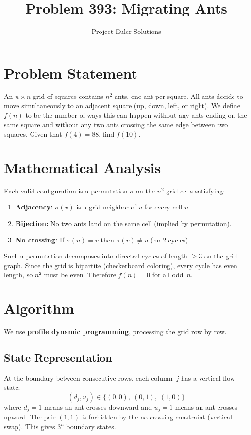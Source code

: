 \documentclass[11pt]{article}
\title{Problem 393: Migrating Ants}
\author{Project Euler Solutions}
\date{}
\begin{document}
\maketitle

\section{Problem Statement}
An $n \times n$ grid of squares contains $n^2$ ants, one ant per square. All ants decide to move simultaneously to an adjacent square (up, down, left, or right). We define $f(n)$ to be the number of ways this can happen without any ants ending on the same square and without any two ants crossing the same edge between two squares. Given that $f(4) = 88$, find $f(10)$.

\section{Mathematical Analysis}
Each valid configuration is a permutation $\sigma$ on the $n^2$ grid cells satisfying:
\begin{enumerate}
    \item \textbf{Adjacency:} $\sigma(v)$ is a grid neighbor of $v$ for every cell $v$.
    \item \textbf{Bijection:} No two ants land on the same cell (implied by permutation).
    \item \textbf{No crossing:} If $\sigma(u) = v$ then $\sigma(v) \neq u$ (no 2-cycles).
\end{enumerate}

Such a permutation decomposes into directed cycles of length $\geq 3$ on the grid graph. Since the grid is bipartite (checkerboard coloring), every cycle has even length, so $n^2$ must be even. Therefore $f(n) = 0$ for all odd~$n$.

\section{Algorithm}
We use \textbf{profile dynamic programming}, processing the grid row by row.

\subsection{State Representation}
At the boundary between consecutive rows, each column~$j$ has a vertical flow state:
\[
(d_j, u_j) \in \{(0,0),\; (0,1),\; (1,0)\}
\]
where $d_j = 1$ means an ant crosses downward and $u_j = 1$ means an ant crosses upward. The pair $(1,1)$ is forbidden by the no-crossing constraint (vertical swap). This gives $3^n$ boundary states.
\end{document}
